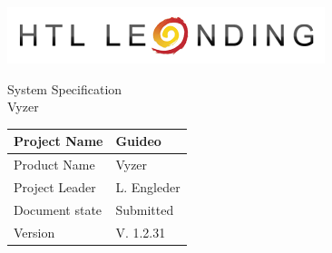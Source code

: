 \documentclass[12pt]{article}
\theoremstyle{definition}
\newcommand{\projectname}{Guideo}
\newcommand{\productname}{Vyzer}
\newcommand{\projectleader}{L. Engleder}
\newcommand{\documentstatus}{Submitted}
\newcommand{\version}{V. 1.2.31}
\begin{document}
\begin{titlepage}
\begin{flushright}
\includegraphics[scale=.5]{htlleondinglogo.png}\\
\end{flushright}

\vspace{10em}

\begin{center}
{\Huge System Specification} \\[3em]
{\LARGE \productname} \\[3em]
\end{center}

\begin{flushleft}
\begin{tabular}{|l|l|}
\hline
Project Name & \projectname \\ \hline
Product Name & \productname \\ \hline
Project Leader & \projectleader \\ \hline
Document state & \documentstatus \\ \hline
Version & \version \\ \hline
\end{tabular}
\end{flushleft}

\end{titlepage}
\end{document}
